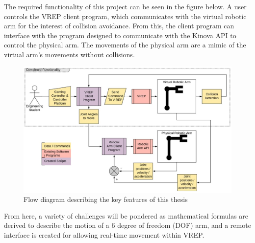 \documentclass[12pt,openany,a4paper]{book}
\begin{document}
The required functionality of this project can be seen in the figure below. A user controls the VREP client program, which communicates with the virtual robotic arm for the interest of collision avoidance. From this, the client program can interface with the program designed to communicate with the Kinova API to control the physical arm. The movements of the physical arm are a mimic of the virtual arm's movements without collisions.


\begin{center}
\begin{figure}[htb]
  \includegraphics[width=1.12\linewidth]{Thesis_flow_chart.jpg}
\caption{Flow diagram describing the key features of this thesis}
\end{figure}
\end{center}


From here, a variety of challenges will be pondered as mathematical formulas are derived to describe the motion of a 6 degree of freedom (DOF) arm, and a remote interface is created for allowing real-time movement within VREP.\\

%
%
\end{document}
